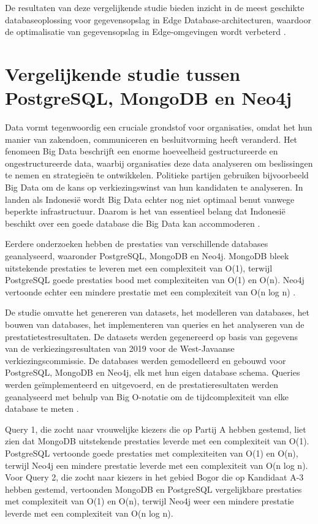 De resultaten van deze vergelijkende studie bieden inzicht in de meest geschikte databaseoplossing voor gegevensopslag in Edge Database-architecturen, waardoor de optimalisatie van gegevensopslag in Edge-omgevingen wordt verbeterd \autocite{Gyorodi2015comparative}.

\section{Vergelijkende studie tussen PostgreSQL, MongoDB en Neo4j}

Data vormt tegenwoordig een cruciale grondstof voor organisaties, omdat het hun manier van zakendoen, communiceren en besluitvorming heeft veranderd. Het fenomeen Big Data beschrijft een enorme hoeveelheid gestructureerde en ongestructureerde data, waarbij organisaties deze data analyseren om beslissingen te nemen en strategieën te ontwikkelen. Politieke partijen gebruiken bijvoorbeeld Big Data om de kans op verkiezingswinst van hun kandidaten te analyseren. In landen als Indonesië wordt Big Data echter nog niet optimaal benut vanwege beperkte infrastructuur. Daarom is het van essentieel belang dat Indonesië beschikt over een goede database die Big Data kan accommoderen \autocite{Gyorodi2015comparative}.

Eerdere onderzoeken hebben de prestaties van verschillende databases geanalyseerd, waaronder PostgreSQL, MongoDB en Neo4j. MongoDB bleek uitstekende prestaties te leveren met een complexiteit van O(1), terwijl PostgreSQL goede prestaties bood met complexiteiten van O(1) en O(n). Neo4j vertoonde echter een mindere prestatie met een complexiteit van O(n log n) \autocite{Gyorodi2015comparative}.

De studie omvatte het genereren van datasets, het modelleren van databases, het bouwen van databases, het implementeren van queries en het analyseren van de prestatietestresultaten. De datasets werden gegenereerd op basis van gegevens van de verkiezingsresultaten van 2019 voor de West-Javaanse verkiezingscommissie. De databases werden gemodelleerd en gebouwd voor PostgreSQL, MongoDB en Neo4j, elk met hun eigen database schema. Queries werden geïmplementeerd en uitgevoerd, en de prestatieresultaten werden geanalyseerd met behulp van Big O-notatie om de tijdcomplexiteit van elke database te meten \autocite{Gyorodi2015comparative}.

Query 1, die zocht naar vrouwelijke kiezers die op Partij A hebben gestemd, liet zien dat MongoDB uitstekende prestaties leverde met een complexiteit van O(1). PostgreSQL vertoonde goede prestaties met complexiteiten van O(1) en O(n), terwijl Neo4j een mindere prestatie leverde met een complexiteit van O(n log n). Voor Query 2, die zocht naar kiezers in het gebied Bogor die op Kandidaat A-3 hebben gestemd, vertoonden MongoDB en PostgreSQL vergelijkbare prestaties met complexiteit van O(1) en O(n), terwijl Neo4j weer een mindere prestatie leverde met een complexiteit van O(n log n).

